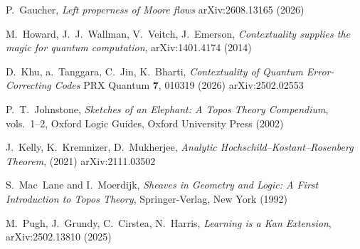 \documentclass{article}
\numberwithin{tm}{section}
\numberwithin{dn}{section}
\numberwithin{as}{section}
\numberwithin{rk}{section}
\numberwithin{lem}{section}
\numberwithin{ax}{section}
\numberwithin{pp}{section}
\numberwithin{eg}{section}
\numberwithin{war}{section}
\numberwithin{equation}{section}
\numberwithin{prop}{section}
\numberwithin{nt}{section}
\numberwithin{rc}{section}
\begin{document}
\begin{thebibliography}{9}
	P.~Gaucher,
	\emph{Left properness of Moore flows}
		arXiv:2608.13165 (2026)
	
	M.~Howard, J.~J.~Wallman, V.~Veitch, J.~Emerson,
	\emph{Contextuality supplies the magic for quantum computation},
		arXiv:1401.4174 (2014)
	
	D.~Khu, a.~Tanggara, C.~Jin, K.~Bharti,
	\emph{Contextuality of Quantum Error-Correcting Codes}
	PRX Quantum \textbf{7}, 010319 (2026)
		arXiv:2502.02553
	
	P.~T.~Johnstone,
	\emph{Sketches of an Elephant: A Topos Theory Compendium},
	vols.~1--2, Oxford Logic Guides, Oxford University Press (2002)
	
	J.~Kelly, K.~Kremnizer, D.~Mukherjee,
	\emph{Analytic Hochschild--Kostant--Rosenberg Theorem}, (2021)	arXiv:2111.03502
	
S.~Mac~Lane and I.~Moerdijk,
\emph{Sheaves in Geometry and Logic: A First Introduction to Topos Theory},
Springer-Verlag, New York (1992)

M.~Pugh, J.~Grundy, C.~Cirstea, N.~Harris,
\emph{Learning is a Kan Extension},
	arXiv:2502.13810 (2025)
\end{thebibliography}
\end{document}
